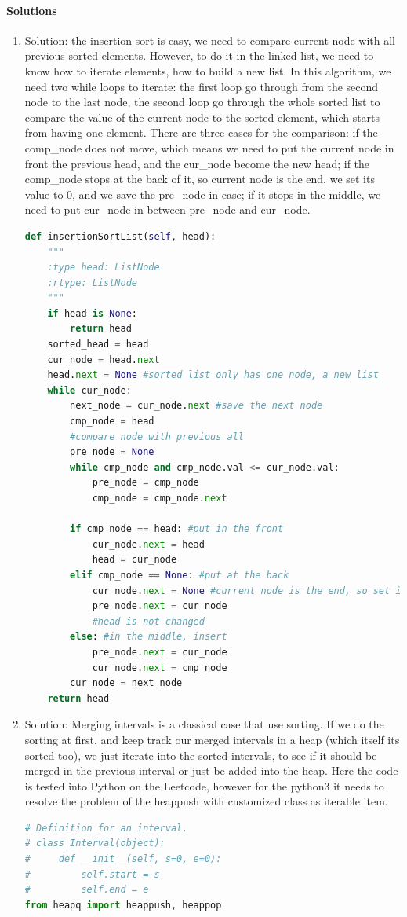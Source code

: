 \documentclass[../main.tex]{subfiles}
\begin{document}
\paragraph{Solutions}
\begin{enumerate}
    \item Solution: the insertion sort is easy, we need to compare current node with all previous sorted elements. However, to do it in the linked list, we need to know how to iterate elements, how to build a new list. In this algorithm, we need two while loops to iterate: the first loop go through from the second node to the last node, the second loop go through the whole sorted list to compare the value of the current node to the sorted element, which starts from having one element. There are three cases for the comparison: if the comp\_node does not move, which means we need to put the current node in front the previous head, and the cur\_node become the new head; if the comp\_node stops at the back of it, so current node is the end, we set its value to 0, and we save the pre\_node in case; if it stops in the middle, we need to put cur\_node in between pre\_node and cur\_node. 
\begin{lstlisting}[language = Python]
def insertionSortList(self, head):
    """
    :type head: ListNode
    :rtype: ListNode
    """
    if head is None:
        return head
    sorted_head = head
    cur_node = head.next
    head.next = None #sorted list only has one node, a new list
    while cur_node:
        next_node = cur_node.next #save the next node
        cmp_node = head
        #compare node with previous all
        pre_node = None
        while cmp_node and cmp_node.val <= cur_node.val:
            pre_node = cmp_node
            cmp_node = cmp_node.next

        if cmp_node == head: #put in the front
            cur_node.next = head
            head = cur_node
        elif cmp_node == None: #put at the back
            cur_node.next = None #current node is the end, so set it to None
            pre_node.next = cur_node
            #head is not changed
        else: #in the middle, insert
            pre_node.next = cur_node
            cur_node.next = cmp_node
        cur_node = next_node
    return head
\end{lstlisting}

\item  Solution: Merging intervals is a classical case that use sorting. If we do the sorting at first, and keep track our merged intervals in a heap (which itself its sorted too), we just iterate into the sorted intervals, to see if it should be merged in the previous interval or just be added into the heap. Here the code is tested into Python on the Leetcode, however for the python3 it needs to resolve the problem of the heappush with customized class as iterable item.
\begin{lstlisting}[language = Python]
# Definition for an interval.
# class Interval(object):
#     def __init__(self, s=0, e=0):
#         self.start = s
#         self.end = e
from heapq import heappush, heappop


\end{lstlisting}
\end{enumerate}
\end{document}
